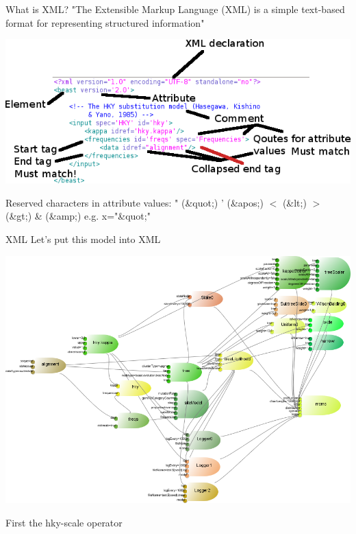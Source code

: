 \documentclass{beamer}
\theoremstyle{definition}
\begin{document}
\begin{frame}{What is XML?}
"The Extensible Markup Language (XML) is a simple text-based format for representing structured information"\vskip1cm

\includegraphics[width=\textwidth]{xml.png}\vskip1cm

{\small Reserved characters in attribute values: " (\&quot;) ' (\&apos;) $<$ (\&lt;) $>$ (\&gt;) \& (\&amp;)
e.g. x="\&quot;"}

\end{frame}


\begin{frame}{XML}
Let's put this model into XML 

\includegraphics[width=\textwidth]{example5.png}

First the hky-scale operator

\end{frame}
\end{document}
